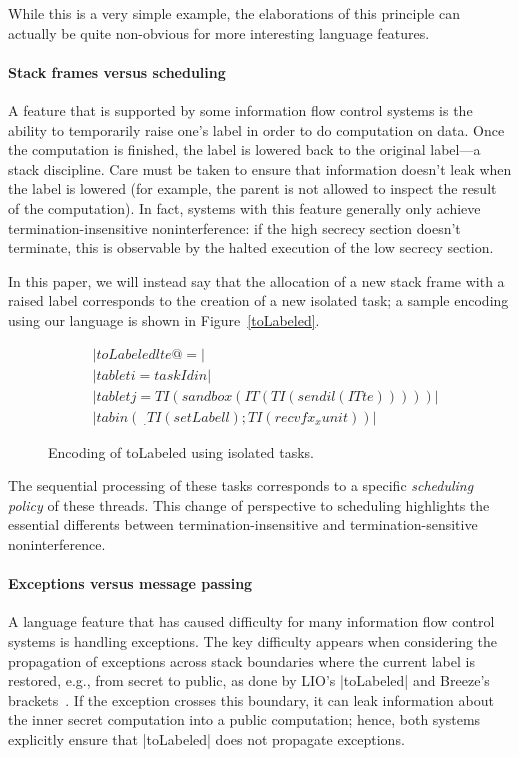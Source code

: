 While this is a very simple example, the elaborations of this principle
can actually be quite non-obvious for more interesting language
features.

\paragraph{Stack frames versus scheduling}  A feature that is supported
by some information flow control systems is the ability to temporarily
raise one's label in order to do computation on data.  Once the
computation is finished, the label is lowered back to the original
label---a stack discipline.  Care must be taken to ensure that
information doesn't leak when the label is lowered (for example, the
parent is not allowed to inspect the result of the computation). In
fact, systems with this feature generally only achieve
termination-insensitive noninterference: if the high secrecy section
doesn't terminate, this is observable by the halted execution of the low
secrecy section.

In this paper, we will instead say that the allocation of a new
stack frame with a raised label corresponds to the creation of a
new isolated task; a sample encoding using our language is
shown in Figure~\ref{toLabeled}.

\begin{figure}
\begin{align*}
    & |toLabeled l te @= | \\
    & |tab let i = taskId in| \\
    & |tab let j = TI (sandbox (IT (TI (send i l (IT te)))))| \\
    & |tab in (\ _ . TI (setLabel l); TI (recvf x _ x unit))|
\end{align*}
\caption{Encoding of toLabeled using isolated tasks.}\label{fig:toLabeled}
\end{figure}

The sequential processing of these
tasks corresponds to a specific \emph{scheduling policy} of these
threads.  This change of perspective to scheduling highlights the
essential differents between termination-insensitive and termination-sensitive
noninterference.

\paragraph{Exceptions versus message passing}
A language feature that has caused difficulty for
many information flow control systems is handling exceptions.
%
The key difficulty appears when considering the propagation of exceptions
across stack boundaries where the current label is restored, e.g., from secret
to public, as done by LIO's |toLabeled| and Breeze's
brackets~\cite{Hritcu:2013:YIB:2497621.2498098, stefan:2012:arxiv-flexible}.
%
If the exception crosses this boundary, it can leak information about the
inner secret computation into a public computation; hence, both systems
explicitly ensure that |toLabeled| does not propagate exceptions.

